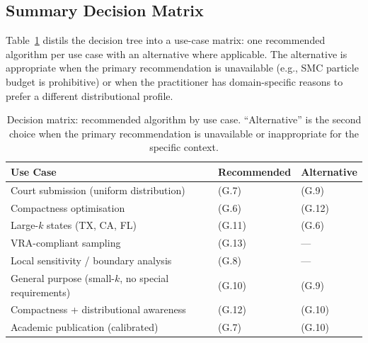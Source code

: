 \begin{center}
\end{center}

\subsection{Summary Decision Matrix}

Table~\ref{tab:decision} distils the decision tree into a use-case matrix:
one recommended algorithm per use case with an alternative where applicable.
The alternative is appropriate when the primary recommendation is unavailable
(e.g., SMC particle budget is prohibitive) or when the practitioner has
domain-specific reasons to prefer a different distributional profile.

\begin{table}[ht]
\centering
\caption{%
  Decision matrix: recommended algorithm by use case.
  ``Alternative'' is the second choice when the primary recommendation
  is unavailable or inappropriate for the specific context.
}
\label{tab:decision}
\begin{tabular}{@{}lll@{}}
\toprule
Use Case & Recommended & Alternative \\
\midrule
Court submission (uniform distribution)
  & \smc{} (G.7) & \fr{} (G.9) \\
Compactness optimisation
  & \sburst{} (G.6) & \sburstf{} (G.12) \\
Large-$k$ states (TX, CA, FL)
  & \ms{} (G.11) & \sburst{} (G.6) \\
VRA-compliant sampling
  & \vra{} (G.13) & --- \\
Local sensitivity / boundary analysis
  & \flip{} (G.8) & --- \\
General purpose (small-$k$, no special requirements)
  & \msp{} (G.10) & \fr{} (G.9) \\
Compactness + distributional awareness
  & \sburstf{} (G.12) & \msp{} (G.10) \\
Academic publication (calibrated)
  & \smc{} (G.7) & \msp{} (G.10) \\
\bottomrule
\end{tabular}
\end{table}


